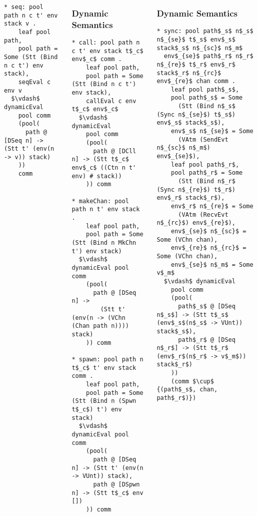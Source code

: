 \documentclass{beamer}
\begin{document}
\begin{frame}[fragile]
\begin{columns}
\begin{frame}[fragile]
\begin{lstlisting}[language=logic, mathescape]
* seq: pool path n c t' env stack v .
    leaf pool path,
    pool path = Some (Stt (Bind n c t') env stack),
    seqEval c env v
  $\vdash$ dynamicEval
    pool comm
    (pool(
      path @ [DSeq n] -> (Stt t' (env(n -> v)) stack)
    ))
    comm
\end{lstlisting}
\end{frame}

\begin{frame}[fragile]
	\frametitle{Dynamic Semantics}
\begin{lstlisting}[language=logic, mathescape]
* call: pool path n c t' env stack t$_c$ env$_c$ comm .
    leaf pool path,
    pool path = Some (Stt (Bind n c t') env stack),
    callEval c env t$_c$ env$_c$
  $\vdash$ dynamicEval
    pool comm
    (pool(
      path @ [DCll n] -> (Stt t$_c$ env$_c$ ((Ctn n t' env) # stack))
    )) comm

* makeChan: pool path n t' env stack .
    leaf pool path,
    pool path = Some (Stt (Bind n MkChn t') env stack)
  $\vdash$ dynamicEval pool comm 
    (pool(
      path @ [DSeq n] ->
        (Stt t' (env(n -> (VChn (Chan path n)))) stack)
    )) comm

* spawn: pool path n t$_c$ t' env stack comm .
    leaf pool path, 
    pool path = Some (Stt (Bind n (Spwn t$_c$) t') env stack)
  $\vdash$ dynamicEval pool comm 
    (pool(
      path @ [DSeq n] -> (Stt t' (env(n -> VUnt)) stack),
      path @ [DSpwn n] -> (Stt t$_c$ env [])
    )) comm
\end{lstlisting}
\end{frame}

\begin{frame}[fragile]
	\frametitle{Dynamic Semantics}
\begin{lstlisting}[language=logic, mathescape]
* sync: pool path$_s$ n$_s$ n$_{se}$ t$_s$ env$_s$ stack$_s$ n$_{sc}$ n$_m$
  env$_{se}$ path$_r$ n$_r$ n$_{re}$ t$_r$ env$_r$ stack$_r$ n$_{rc}$ env$_{re}$ chan comm .
    leaf pool path$_s$,
    pool path$_s$ = Some
      (Stt (Bind n$_s$ (Sync n$_{se}$) t$_s$) env$_s$ stack$_s$),
    env$_s$ n$_{se}$ = Some
      (VAtm (SendEvt n$_{sc}$ n$_m$) env$_{se}$),
    leaf pool path$_r$,
    pool path$_r$ = Some
      (Stt (Bind n$_r$ (Sync n$_{re}$) t$_r$) env$_r$ stack$_r$),
    env$_r$ n$_{re}$ = Some
      (VAtm (RecvEvt n$_{rc}$) env$_{re}$),
    env$_{se}$ n$_{sc}$ = Some (VChn chan),
    env$_{re}$ n$_{rc}$ = Some (VChn chan), 
    env$_{se}$ n$_m$ = Some v$_m$
  $\vdash$ dynamicEval
    pool comm
    (pool(
      path$_s$ @ [DSeq n$_s$] -> (Stt t$_s$ (env$_s$(n$_s$ -> VUnt)) stack$_s$), 
      path$_r$ @ [DSeq n$_r$] -> (Stt t$_r$ (env$_r$(n$_r$ -> v$_m$)) stack$_r$)
    )) 
    (comm $\cup$ {(path$_s$, chan, path$_r$)})
\end{lstlisting}
\end{frame}


\end{columns}
\end{frame}
\end{document}
